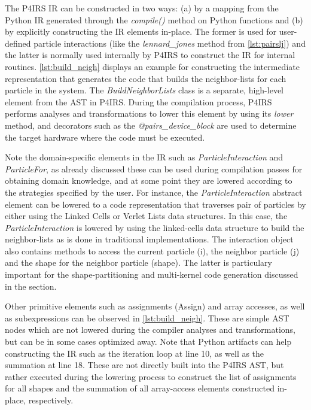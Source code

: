 \documentclass[Afour,sageh,times]{sagej}
\newcommand{\RMchange}[1]{{\color{blue} #1}}
\begin{document}
\RMchange{The P4IRS IR can be constructed in two ways: (a) by a mapping from the Python IR generated through the \emph{compile()} method on Python functions and (b) by explicitly constructing the IR elements in-place.
The former is used for user-defined particle interactions (like the \emph{lennard\_jones} method from \autoref{lst:pairslj}) and the latter is normally used internally by P4IRS to construct the IR for internal routines.}
\autoref{lst:build_neigh} displays an example for constructing the intermediate representation that generates the code that builds the neighbor-lists for each particle in the system.
The \emph{BuildNeighborLists} class is a separate, high-level element from the AST in P4IRS.
During the compilation process, P4IRS performs analyses and transformations to lower this element by using its \emph{lower} method, and decorators such as the \emph{@pairs\_device\_block} are used to determine the target hardware where the code must be executed.

\RMchange{Note the domain-specific elements in the IR such as \emph{ParticleInteraction} and \emph{ParticleFor}, as already discussed these can be used during compilation passes for obtaining domain knowledge, and at some point they are lowered according to the strategies specified by the user.
For instance, the \emph{ParticleInteraction} abstract element can be lowered to a code representation that traverses pair of particles by either using the Linked Cells or Verlet Lists data structures.}
In this case, the \emph{ParticleInteraction} is lowered by using the linked-cells data structure to build the neighbor-lists as is done in traditional implementations.
The interaction object also contains methods to access the current particle (i), the neighbor particle (j) and the shape for the neighbor particle (shape).
The latter is particulary important for the shape-partitioning and multi-kernel code generation discussed in the  section.

Other primitive elements such as assignments (Assign) and array accesses, as well as subexpressions can be observed in \autoref{lst:build_neigh}.
These are simple AST nodes which are not lowered during the compiler analyses and transformations, but can be in some cases optimized away.
Note that Python artifacts can help constructing the IR such as the iteration loop at line 10, as well as the summation at line 18.
These are not directly built into the P4IRS AST, but rather executed during the lowering process to construct the list of assignments for all shapes and the summation of all array-access elements constructed in-place, respectively.
\end{document}
